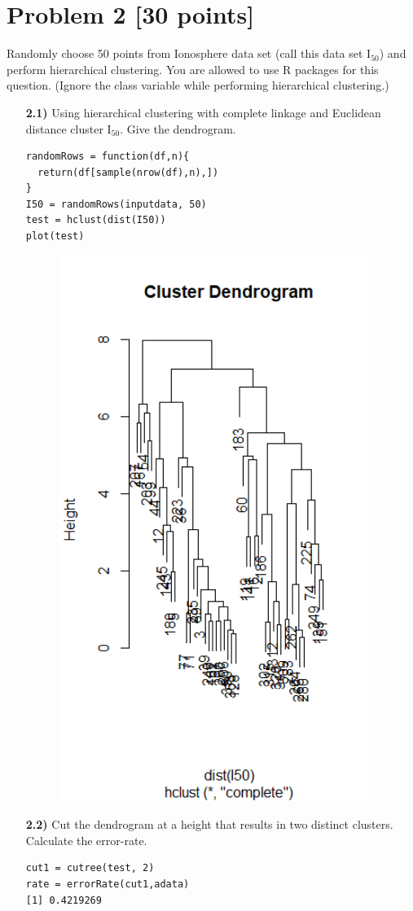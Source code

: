 \documentclass{article}
\begin{document}
 \section*{Problem 2 [30 points]}  Randomly choose 50 points from Ionosphere data set (call this data set $\text{I}_{50}$) and perform hierarchical clustering. You are allowed to use R packages for this question. (Ignore the class variable while performing hierarchical clustering.)
 \\ 
 \begin{enumerate}
  \item[\textbf{2.1)}]  Using hierarchical clustering with complete linkage and Euclidean distance cluster $\text{I}_{50}$. Give the dendrogram.
\\ 
 \begin{lstlisting}
randomRows = function(df,n){
  return(df[sample(nrow(df),n),])
}
I50 = randomRows(inputdata, 50)
test = hclust(dist(I50))
plot(test)
\end{lstlisting}
\begin{figure}
  \includegraphics[width=100mm, scale = 0.5]{random.png}
\end{figure}
\item[\textbf{2.2)}] Cut the dendrogram at a height that results in two distinct  clusters. Calculate the error-rate.
\\  
 \begin{lstlisting}
cut1 = cutree(test, 2)
rate = errorRate(cut1,adata)
[1] 0.4219269
\end{lstlisting}


\end{enumerate}
\end{document}

